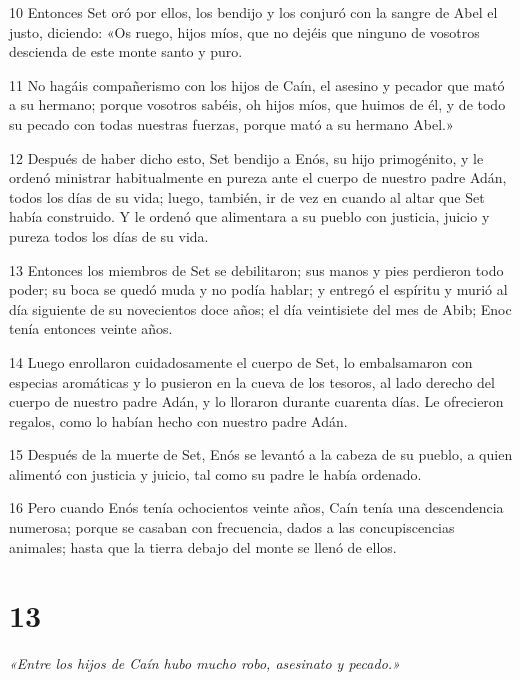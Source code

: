 \par 10 Entonces Set oró por ellos, los bendijo y los conjuró con la sangre de Abel el justo, diciendo: «Os ruego, hijos míos, que no dejéis que ninguno de vosotros descienda de este monte santo y puro.

\par 11 No hagáis compañerismo con los hijos de Caín, el asesino y pecador que mató a su hermano; porque vosotros sabéis, oh hijos míos, que huimos de él, y de todo su pecado con todas nuestras fuerzas, porque mató a su hermano Abel.»

\par 12 Después de haber dicho esto, Set bendijo a Enós, su hijo primogénito, y le ordenó ministrar habitualmente en pureza ante el cuerpo de nuestro padre Adán, todos los días de su vida; luego, también, ir de vez en cuando al altar que Set había construido. Y le ordenó que alimentara a su pueblo con justicia, juicio y pureza todos los días de su vida.

\par 13 Entonces los miembros de Set se debilitaron; sus manos y pies perdieron todo poder; su boca se quedó muda y no podía hablar; y entregó el espíritu y murió al día siguiente de su novecientos doce años; el día veintisiete del mes de Abib; Enoc tenía entonces veinte años.

\par 14 Luego enrollaron cuidadosamente el cuerpo de Set, lo embalsamaron con especias aromáticas y lo pusieron en la cueva de los tesoros, al lado derecho del cuerpo de nuestro padre Adán, y lo lloraron durante cuarenta días. Le ofrecieron regalos, como lo habían hecho con nuestro padre Adán.

\par 15 Después de la muerte de Set, Enós se levantó a la cabeza de su pueblo, a quien alimentó con justicia y juicio, tal como su padre le había ordenado.

\par 16 Pero cuando Enós tenía ochocientos veinte años, Caín tenía una descendencia numerosa; porque se casaban con frecuencia, dados a las concupiscencias animales; hasta que la tierra debajo del monte se llenó de ellos.

\chapter{13}

\par \textit{«Entre los hijos de Caín hubo mucho robo, asesinato y pecado.»}

